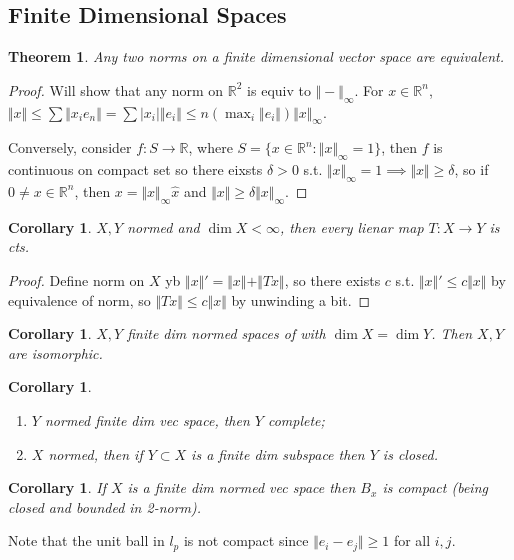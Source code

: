 \documentclass{article}
\theoremstyle{definition}
\theoremstyle{remark}
\theoremstyle{plain}
\newtheorem{thm}[defn]{Theorem}
\newtheorem{crly}[defn]{Corollary}
\newcommand{\RR}{\mathbb{R}}
\begin{document}
\subsection{Finite Dimensional Spaces}
\begin{thm}
    Any two norms on a finite dimensional vector space are equivalent.
\end{thm}
\begin{proof}
    Will show that any norm on $\RR^2$ is equiv to $\Vert -\Vert_\infty$. For $x\in\RR^n$, $\Vert x\Vert\le\sum\Vert x_ie_n\Vert=\sum|x_i|\Vert e_i\Vert\le n(\max_i\Vert e_i\Vert)\Vert x\Vert_\infty$.

    Conversely, consider $f:S\to \RR$, where $S=\{x\in\RR^n:\Vert x\Vert_\infty=1\}$, then $f$ is continuous on compact set so there eixsts $\delta>0$ s.t. $\Vert x\Vert_\infty=1\implies \Vert x\Vert\ge \delta$, so if $0\neq x\in\RR^n$, then $x=\Vert x\Vert_\infty\hat{x}$ and $\Vert x\Vert\ge \delta\Vert x\Vert_\infty$.
\end{proof}
\begin{crly}
    $X,Y$ normed and $\dim X<\infty$, then every lienar map $T:X\to Y$ is cts.
\end{crly}
\begin{proof}
    Define norm on $X$ yb $\Vert x\Vert'=\Vert x\Vert+\Vert Tx\Vert$, so there exists $c$ s.t. $\Vert x\Vert'\le c\Vert x\Vert$ by equivalence of norm, so $\Vert Tx\Vert\le c\Vert x\Vert$ by unwinding a bit.
\end{proof}
\begin{crly}
    $X,Y$ finite dim normed spaces of with $\dim X=\dim Y$. Then $X,Y$ are isomorphic.
\end{crly}
\begin{crly}
    \begin{enumerate}
        \item $Y$ normed finite dim vec space, then $Y$ complete;
        \item $X$ normed, then if $Y\subset X$ is a finite dim subspace then $Y$ is closed.
    \end{enumerate}
\end{crly}
\begin{crly}
    If $X$ is a finite dim normed vec space then $B_x$ is compact (being closed and bounded in 2-norm).
\end{crly}
Note that the unit ball in $l_p$ is not compact since $\Vert e_i-e_j\Vert\ge 1$ for all $i,j$.
\end{document}

